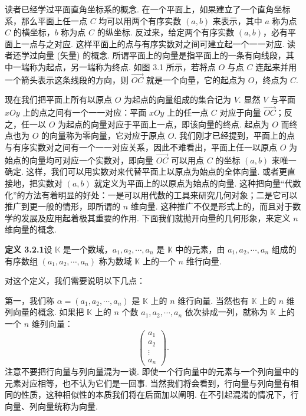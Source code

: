 \documentclass[UTF8, 12pt, fontset=fandol, oneside]{ctexart}
\begin{document}
读者已经学过平面直角坐标系的概念. 在一个平面上，如果建立了一个直角坐标系，那么平面上任一点 $C$ 均可以用两个有序实数 $(a,b)$ 来表示，其中 $a$ 称为点 $C$ 的横坐标，$b$ 称为点 $C$ 的纵坐标. 反过来，给定两个有序实数 $(a,b)$，必有平面上一点与之对应. 这样平面上的点与有序实数对之间可建立起一个一一对应. 读者还学过向量 (矢量) 的概念. 所谓平面上的向量是指平面上的一条有向线段，其中一端称为起点，另一端称为终点. 如图 3.1 所示，若将点 $O$ 与点 $C$ 连起来并用一个箭头表示这条线段的方向，则 $\overrightarrow{OC}$ 就是一个向量，它的起点为 $O$，终点为 $C$.

现在我们把平面上所有以原点 $O$ 为起点的向量组成的集合记为 $V$. 显然 $V$ 与平面 $xOy$ 上的点之间有一个一一对应：平面 $xOy$ 上的任一点 $C$ 对应于向量 $\overrightarrow{OC}$；反之，任一以 $O$ 为起点的向量对应于平面上一点，即该向量的终点. 起点为 $O$ 而终点也为 $O$ 的向量称为零向量，它对应于原点 $O$. 我们刚才已经提到，平面上的点与有序实数对之间有一个一一对应关系，因此不难看出，平面上任一以原点 $O$ 为始点的向量均可对应一个实数对，即向量 $\overrightarrow{OC}$ 可以用点 $C$ 的坐标 $(a,b)$ 来唯一确定. 这样，我们可以用实数对来代替平面上以原点为始点的全体向量. 或者更直接地，把实数对 $(a,b)$ 就定义为平面上的以原点为始点的向量. 这种把向量“代数化”的方法有着明显的好处：一是可以用代数的工具来研究几何对象；二是它可以推广到更一般的情形，即所谓的 $n$ 维向量. 这种推广不仅是形式上的，而且对于数学的发展及应用起着极其重要的作用. 下面我们就抛开向量的几何形象，来定义 $n$ 维向量的概念.

\noindent\textbf{定义 3.2.1}\quad 设 $\mathbb{K}$ 是一个数域，$a_1,a_2,\cdots,a_n$ 是 $\mathbb{K}$ 中的元素，由 $a_1,a_2,\cdots,a_n$ 组成的有序数组 $(a_1,a_2,\cdots,a_n)$ 称为数域 $\mathbb{K}$ 上的一个 $n$ 维行向量.

对这个定义，我们需要说明以下几点：

第一，我们称 $\alpha=(a_1,a_2,\cdots,a_n)$ 是 $\mathbb{K}$ 上的 $n$ 维行向量. 当然也有 $\mathbb{K}$ 上的 $n$ 维列向量的概念. 如果把 $\mathbb{K}$ 上的 $n$ 个数 $a_1,a_2,\cdots,a_n$ 依次排成一列，就称为 $\mathbb{K}$ 上的一个 $n$ 维列向量：
\[
\left(\begin{array}{c}
a_1\\
a_2\\
\vdots\\
a_n
\end{array}\right).
\]
注意不要把行向量与列向量混为一谈. 即使一个行向量中的元素与一个列向量中的元素对应相等，也不认为它们是一回事. 当然我们将会看到，行向量与列向量有相同的性质，这种相似性的本质我们将在后面加以阐明. 在不引起混淆的情况下，行向量、列向量统称为向量.
\end{document}
